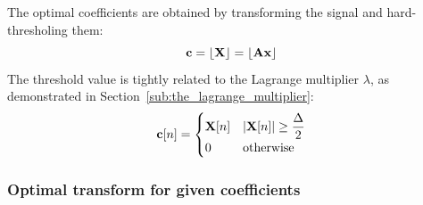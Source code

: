 \documentclass[11pt,a4paper,openright,twoside]{book}
\numberwithin{equation}{section} %
\begin{document}
The optimal coefficients are obtained by transforming the signal and
hard-thresholing them:
\begin{equation}
	\mathbf{c} = \lfloor \mathbf{X} \rfloor = \lfloor \mathbf{A} \mathbf{x} \rfloor
\end{equation}
The threshold value is tightly related to the Lagrange multiplier $\lambda$,
as demonstrated in Section~\ref{sub:the_lagrange_multiplier}:
\begin{equation}
	\mathbf{c}[n] =
	\begin{cases}
		\mathbf{X}[n] & \vert \mathbf{X}[n] \vert \ge \displaystyle \frac{\Delta}{2} \\
		0     & \text{otherwise} \\
	\end{cases}
	\label{eqn:hard_threshold}
\end{equation}

\subsubsection{Optimal transform for given coefficients}
\label{ssub:optimal_transform_for_given_coefficients}
\end{document}
